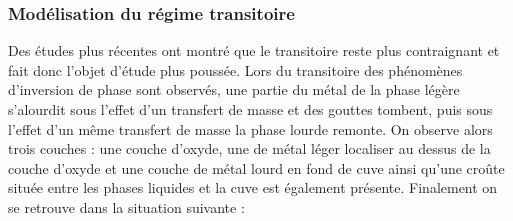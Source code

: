 \subsubsection{Modélisation du régime transitoire}
Des études plus récentes ont montré que le transitoire reste plus contraignant et fait donc l'objet d'étude plus poussée. Lors du transitoire des phénomènes d'inversion de phase sont observés, une partie du métal de la phase légère s'alourdit sous l'effet d'un transfert de masse et des gouttes tombent, puis sous l'effet d'un même transfert de masse la phase lourde remonte. On observe alors trois couches : une couche d'oxyde, une de métal léger localiser au dessus de la couche d'oxyde et une couche de métal lourd en fond de cuve ainsi qu'une croûte située entre les phases liquides et la cuve est également présente. Finalement on se retrouve dans la situation suivante :
